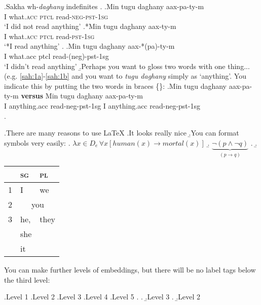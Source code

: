 \documentclass[letterpaper]{article}
\begin{document}
\ex.Sakha wh-\textit{daghany} indefinites\label{sah:1}
\a.\label{sah:1a}
    \ag.Min tugu daghany aax-pa-ty-m\label{sah:1ai}\\
    I what.\textsc{acc} \textsc{ptcl} read-\textsc{neg-pst-1sg}\\
    `I did not read anything'
    \bg.*Min tugu daghany aax-ty-m\label{sah:1aii}\\
    I what.\textsc{acc} \textsc{ptcl} read-\textsc{pst-1sg}\\
    `*I read anything'
    \z. %
\bg.Min tugu daghany aax-*(pa)-ty-m\label{sah:1b}\\
I what.{\sc acc} {\sc ptcl} read-{\sc (neg)-pst-1sg}\\
`I didn't read anything'
\b.Perhaps you want to gloss two words with one thing... (e.g. \ref{sah:1a}-\ref{sah:1b} and you want to \textit{tugu daghany} simply as `anything'. You indicate this by putting the two words in braces \{\}:
    \ag.Min {tugu daghany} aax-pa-ty-m \textbf{versus} Min tugu daghany aax-pa-ty-m\\
    I anything.{\sc acc} read-{\sc neg-pst-1sg} { } I anything.{\sc acc} read-{\sc neg-pst-1sg}\\
    \z.


\ex.There are many reasons to use \LaTeX
    \a.It looks really nice
    \b.You can format symbols very easily:
        \a. $\lambda x\in D_e \, \forall x [human(x)\rightarrow mortal(x)]$
        \b. $\underbrace{\neg (p\wedge \neg q)}_{(p\rightarrow q)}$
        \z. %
    \b.\begin{tabular}[t]{l|ll} %
            & \textsc{sg}   &   \textsc{pl}\\\hline 
        1   & I             &   we \\
        2   & \multicolumn{2}{c}{you}\\
        3   & he,           & they\\
            & she           & \\
            & it            & \\
    \end{tabular}

You can make further levels of embeddings, but there will be no label tags below the third level:

\ex.Level 1
\a.Level 2
    \a.Level 3
        \a.Level 4
            \a.Level 5
            \z. 
        \z.
    \b.Level 3
    \z. 
\b.Level 2
\end{document}
